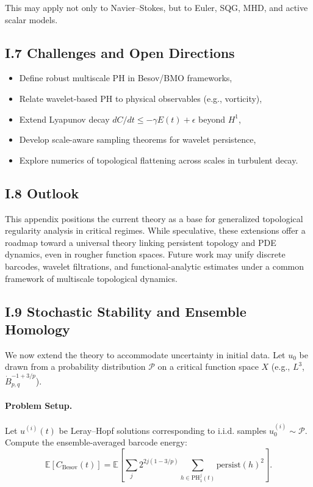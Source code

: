 \documentclass[11pt]{article}
\theoremstyle{definition}
\begin{document}
This may apply not only to Navier--Stokes, but to Euler, SQG, MHD, and active scalar models.

\subsection*{I.7 Challenges and Open Directions}

\begin{itemize}
  \item Define robust multiscale PH in Besov/BMO frameworks,
  \item Relate wavelet-based PH to physical observables (e.g., vorticity),
  \item Extend Lyapunov decay $dC/dt \leq -\gamma E(t) + \epsilon$ beyond $H^1$,
  \item Develop scale-aware sampling theorems for wavelet persistence,
  \item Explore numerics of topological flattening across scales in turbulent decay.
\end{itemize}

\subsection*{I.8 Outlook}

This appendix positions the current theory as a base for generalized topological regularity analysis in critical regimes. While speculative, these extensions offer a roadmap toward a universal theory linking persistent topology and PDE dynamics, even in rougher function spaces. Future work may unify discrete barcodes, wavelet filtrations, and functional-analytic estimates under a common framework of multiscale topological dynamics.

\subsection*{I.9 Stochastic Stability and Ensemble Homology}

We now extend the theory to accommodate uncertainty in initial data. Let $u_0$ be drawn from a probability distribution $\mathcal{P}$ on a critical function space $X$ (e.g., $L^3$, $\dot{B}^{-1+3/p}_{p,q}$).

\paragraph{Problem Setup.} Let $u^{(i)}(t)$ be Leray--Hopf solutions corresponding to i.i.d. samples $u^{(i)}_0 \sim \mathcal{P}$. Compute the ensemble-averaged barcode energy:
\[ \mathbb{E}[C_{\text{Besov}}(t)] = \mathbb{E}\left[\sum_{j} 2^{2j(1 - 3/p)} \sum_{h \in \mathrm{PH}_1^j(t)} \mathrm{persist}(h)^2\right]. \]
\end{document}
